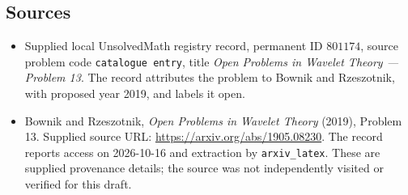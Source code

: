 \documentclass[11pt]{article}
\begin{document}
\subsection{Sources}
\begin{itemize}
\item Supplied local UnsolvedMath registry record, permanent ID \(801174\), source problem code \texttt{catalogue entry}, title \emph{Open Problems in Wavelet Theory --- Problem 13}. The record attributes the problem to Bownik and Rzeszotnik, with proposed year 2019, and labels it open.
\item Bownik and Rzeszotnik, \emph{Open Problems in Wavelet Theory} (2019), Problem 13. Supplied source URL: \url{https://arxiv.org/abs/1905.08230}. The record reports access on 2026-10-16 and extraction by \texttt{arxiv\_latex}. These are supplied provenance details; the source was not independently visited or verified for this draft.
\end{itemize}
\end{document}

